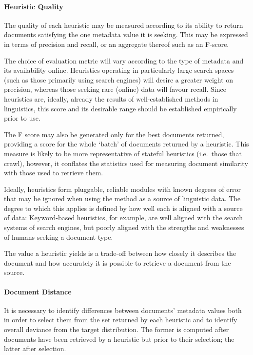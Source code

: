 \paragraph{Heuristic Quality}
The quality of each heuristic may be measured according to its ability to return documents satisfying the one metadata value it is seeking.  This may be expressed in terms of precision and recall, or an aggregate thereof such as an F-score.

The choice of evaluation metric will vary according to the type of metadata and its availability online.  Heuristics operating in particularly large search spaces (such as those primarily using search engines) will desire a greater weight on precision, whereas those seeking rare (online) data will favour recall.  Since heuristics are, ideally, already the results of well-established methods in linguistics, this score and its desirable range should be established empirically prior to use.

The F score may also be generated only for the best documents returned, providing a score for the whole `batch' of documents returned by a heuristic.  This measure is likely to be more representative of stateful heuristics (i.e.\ those that crawl), however, it conflates the statistics used for measuring document similarity with those used to retrieve them.

Ideally, heuristics form pluggable, reliable modules with known degrees of error that may be ignored when using the method as a source of linguistic data.  The degree to which this applies is defined by how well each is aligned with a source of data: Keyword-based heuristics, for example, are well aligned with the search systems of search engines, but poorly aligned with the strengths and weaknesses of humans seeking a document type.

The value a heuristic yields is a trade-off between how closely it describes the document and how accurately it is possible to retrieve a document from the source. 


\paragraph{Document Distance}
It is necessary to identify differences between documents' metadata values both in order to select them from the set returned by each heuristic and to identify overall deviance from the target distribution.  The former is computed after documents have been retrieved by a heuristic but prior to their selection; the latter after selection.

